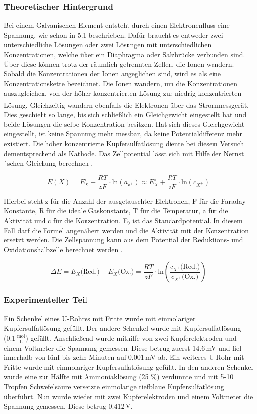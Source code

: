 \documentclass[
	a4paper,										%
	12pt,											%
	twoside,										%
	headsepline,								%
	footsepline,									%
	captions=tableheading,					%
]{scrartcl}
\newcommand{\zitat}[1]{\textsuperscript{\cite{#1}}}
\newcommand{\formel}[2]{				%
	\begin{equation}
		\label{eq: #1}							%
		#2											%
	\end{equation}}
\begin{document}
\subsubsection{Theoretischer Hintergrund}
Bei einem Galvanischen Element entsteht durch einen Elektronenfluss eine Spannung, wie schon in 5.1 beschrieben. Dafür braucht es entweder zwei unterschiedliche Lösungen oder zwei Lösungen mit unterschiedlichen Konzentrationen, welche über ein Diaphragma oder Salzbrücke verbunden sind. Über diese können trotz der räumlich getrennten Zellen, die Ionen wandern. Sobald die Konzentrationen der Ionen angeglichen sind, wird es als eine Konzentrationskette bezeichnet. Die Ionen wandern, um die Konzentrationen auszugleichen, von der höher konzentrierten Lösung zur niedrig konzentrierten Lösung. Gleichzeitig wandern ebenfalls die Elektronen über das Strommessgerät.\zitat{Seminar} Dies geschieht so lange, bis sich schließlich ein Gleichgewicht eingestellt hat und beide Lösungen die selbe Konzentration besitzen.  Hat sich dieses Gleichgewicht eingestellt, ist keine Spannung mehr messbar, da keine Potentialdifferenz mehr existiert. Die höher konzentrierte Kupfersulfatlösung diente bei diesem Versuch dementsprechend als Kathode.
Das Zellpotential lässt sich mit Hilfe der Nernst´schen Gleichung berechnen .

\formel{gl1}{E(X)=E^{\circ}_X + \frac{RT}{zF}\cdot \text{ln}(a_{x^+}) \approx E^{\circ}_X +\frac{RT}{zF}\cdot \text{ln}(c_{X^+})}

Hierbei steht z für die Anzahl der ausgetauschter Elektronen, F für die Faraday Konstante, R für die ideale Gaskonstante, T für die Temperatur, a für die Aktivität und c für die Konzentration. E$_0$ ist das Standardpotential. In diesem Fall darf die Formel angenähert werden und die Aktivität mit der Konzentration ersetzt werden. 
Die Zellspannung kann aus dem Potential der Reduktions- und Oxidationshalbzelle berechnet werden .

\formel{gl2}{\Delta E=E_X\text{(Red.)} - E_X\text{(Ox.)}= \frac{RT}{zF}\cdot \text{ln}(\frac{c_{X^+}\text{(Red.)}}{c_{X^+}\text{(Ox.)}})}


\subsubsection{Experimenteller Teil}

Ein Schenkel eines U-Rohres mit Fritte wurde mit einmolariger Kupfersulfatlösung gefüllt.
Der andere Schenkel wurde mit Kupfersulfatlösung (0.1\,$\mathrm{\frac{mol}{L}}$) gefüllt.
Anschließend wurde mithilfe von zwei Kupferelektroden und einem Voltmeter die Spannung gemessen.
Diese betrug zuerst 14.6\,mV und fiel innerhalb von fünf bis zehn Minuten auf 0.001\,mV ab. 
Ein weiteres U-Rohr mit Fritte wurde mit einmolariger Kupfersulfatlösung gefüllt.
In den anderen Schenkel wurde eine zur Hälfte mit Ammoniaklösung (25 \%) verdünnte und mit 5-10 Tropfen Schwefelsäure versetzte einmolarige tiefblaue Kupfersulfatlösung überführt.
Nun wurde wieder mit zwei Kupferelektroden und einem Voltmeter die Spannung gemessen. Diese betrug 0.412\,V. 
\end{document}
